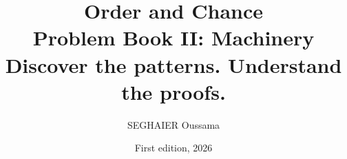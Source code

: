 \documentclass[11pt,openany]{book}
\title{\Huge\textbf{Order and Chance}\\[0.4em]\LARGE Problem Book II: Machinery\\[0.6em]
\Large Discover the patterns. Understand the proofs.}
\author{SEGHAIER Oussama}
\date{First edition, 2026}
\begin{document}
\frontmatter
\makecover
\maketitle

\tableofcontents

\mainmatter



\end{document}
